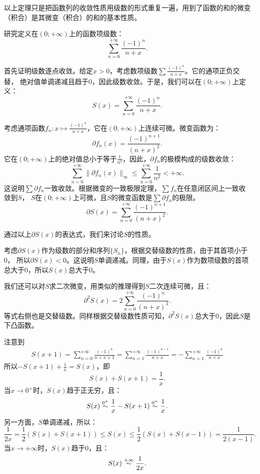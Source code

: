 \documentclass[12pt,UTF8]{ctexbook}
\begin{document}
\begin{appendix}
以上定理只是把函数列的收敛性质用级数的形式重复一遍，用到了函数的和的微变（积合）是其微变（积合）的和的基本性质。

\begin{et}
    研究定义在$(0;+\infty)$上的函数项级数：
    $$\sum_{n=0}^{+\infty} \frac{(-1)^n}{n + x}.$$
\end{et}

\begin{so}
    首先证明级数逐点收敛。给定$x>0$，考虑数项级数$\sum \frac{(-1)^n}{n + x}$。它的通项正负交替，
    绝对值单调递减且趋于$0$，因此级数收敛。于是，我们可以在$(0;+\infty)$上定义：
    $$ S(x) = \sum_{n=0}^{+\infty} \frac{(-1)^n}{n + x}. $$

    考虑通项函数$f_n: x\mapsto \frac{(-1)^n}{n + x}$，它在$(0;+\infty)$上连续可微。微变函数为：
    $$ \partial f_n(x) = \frac{(-1)^{n+1}}{(n + x)^2}. $$
    它在$(0;+\infty)$上的绝对值总小于等于$\frac{1}{n^2}$，因此，$\partial f_n$的极模构成的级数收敛：
    $$ \sum_{n=0}^{+\infty} \| \partial f_n(x) \|_{\infty} \leqslant \sum_{n=0}^{+\infty} \frac{1}{n^2} < +\infty .$$
    这说明$\sum \partial f_n$一致收敛。根据微变的一致极限定理，$\sum f_n$在任意闭区间上一致收敛到$S$，
    $S$在$(0;+\infty)$上可微，且$S$的微变函数是$\sum \partial f_n$的极限。
    $$ \partial S(x) = \sum_{n=0}^{+\infty} \frac{(-1)^{n+1}}{(n + x)^2}. $$

    通过以上$\partial S(x)$的表达式，我们来讨论$S$的性质。

    考虑$\partial S(x)$作为级数的部分和序列$\{S_n\}$，根据交替级数的性质，由于其首项小于$0$，
    所以$\partial S(x) < 0$。这说明$S$单调递减。同理，由于$S(x)$作为数项级数的首项总大于$0$，所以$S(x)$总大于$0$。

    我们还可以对$S$求二次微变，用类似的推理得到$S$二次连续可微，且：
    $$ \partial^2 S(x) = 2\sum_{n=0}^{+\infty} \frac{(-1)^{n}}{(n + x)^3}. $$
    等式右侧也是交替级数。同样根据交替级数性质可知，$\partial^2 S(x)$总大于$0$，因此$S$是下凸函数。

    注意到
    \begin{align*}
        S(x + 1) = \sum_{n=0}^{+\infty} \frac{(-1)^n}{n + x + 1} = \sum_{n=1}^{+\infty} \frac{(-1)^{n-1}}{n + x} = -\sum_{n=1}^{+\infty} \frac{(-1)^{n}}{n + x}
    \end{align*}
    所以$- S(x + 1) + \frac{1}{x} = S(x)$，即
    $$ S(x) + S(x + 1) = \frac{1}{x}.$$
    当$x\to 0^+$时，$S(x)$趋于正无穷，且：
    $$ S(x) \overset{0^+}{\sim} \frac{1}{x} - S(x + 1) \overset{0^+}{\sim} \frac{1}{x}.  $$
    另一方面，$S$单调递减，所以：
    $$ \frac{1}{2x} = \frac{1}{2}\left(S(x) + S(x + 1)\right) \leqslant S(x) \leqslant \frac{1}{2}\left(S(x) + S(x - 1)\right) = \frac{1}{2(x - 1)}.$$
    当$x\to +\infty$时，$S(x)$趋于$0$，且：
    $$ S(x) \overset{+\infty}{\sim} \frac{1}{2x}. $$


\end{so}
\end{appendix}
\end{document}
